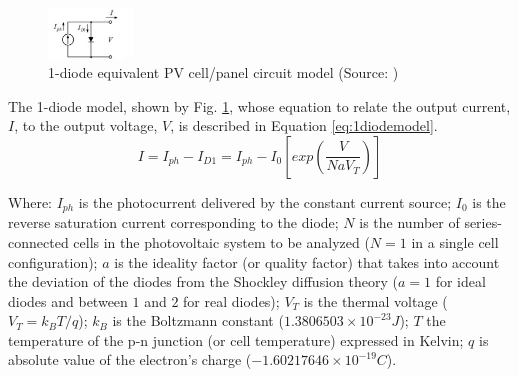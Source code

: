 \documentclass[journal]{IEEEtran}
\begin{document}
\begin{figure}[h]
\includegraphics[width=0.20\textwidth]{equivckt1D}
\centering
\caption{ 1-diode equivalent PV cell/panel circuit model (Source: \cite{Cubas})}
\label{fig:equivckt}
\end{figure}
 
The 1-diode model, shown by Fig. \ref{fig:equivckt}, whose equation to relate the output current, $I$, to the output voltage, $V$, is described in Equation \ref{eq:1diodemodel}. 
\begin{equation}
\label{eq:1diodemodel}
I = I_{ph}-I_{D1}=I_{ph}-I_{0}\left[ exp \left( \dfrac{V}{NaV_{T}} \right)  \right] 
\end{equation}

Where: $I_{ph}$ is the photocurrent delivered by the constant current source; $ I_{0} $ is the reverse saturation current corresponding to the diode; $ N $ is the number of series-connected cells in the photovoltaic system to be analyzed ($ N=1 $ in a single cell configuration); $ a $ is the ideality factor (or quality factor) that takes into account the deviation of the diodes from the Shockley diffusion theory ($a=1$ for ideal diodes and between $ 1 $ and $ 2 $ for real diodes); $V_{T}$ is the thermal voltage ($ V_{T}=k_{B}T/q $); $ k_{B} $ is the Boltzmann constant ($ 1.3806503\times10^{-23}J $); $ T $ the temperature of the p-n junction (or cell temperature) expressed in Kelvin; $ q $ is absolute value of the electron's charge ($ -1.60217646\times10^{-19}C $).
\end{document}
